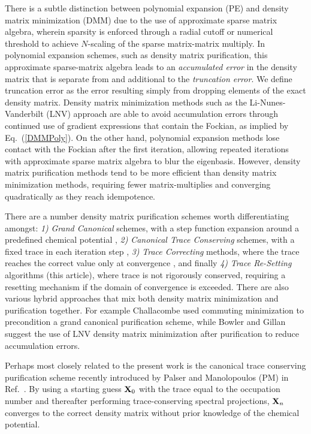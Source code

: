 \commentoutA{\documentclass[prb,aps,twocolumn,showpacs,twocolumngrid,superbib]{revtex4}}
\begin{document}
There is a subtle distinction between polynomial expansion (PE) and density 
matrix minimization (DMM) due to the use of approximate sparse matrix algebra, wherein
sparsity is enforced through a radial cutoff or numerical threshold  to 
achieve $N$-scaling of the sparse matrix-matrix multiply. In polynomial expansion schemes, 
such as density matrix purification, 
this approximate sparse-matrix algebra leads to an {\em accumulated error} in the density matrix 
that is separate from and additional to the {\em truncation error}.  We define truncation error as the 
error resulting simply from dropping elements of the exact density matrix.  Density matrix 
minimization methods such as the Li-Nunes-Vanderbilt \cite{XLi93,DBowler99} (LNV) approach are able to 
avoid accumulation errors through continued use of gradient expressions that contain the Fockian, 
as implied by Eq.~(\ref{DMMPoly}). On the other hand, polynomial expansion methods lose contact 
with the Fockian after the first iteration, allowing repeated iterations with 
approximate sparse matrix algebra to blur the eigenbasis.  However, density matrix purification 
methods tend to be more efficient than density matrix minimization methods, requiring fewer 
matrix-multiplies and converging quadratically as they reach idempotence.

There are a number density matrix purification schemes worth differentiating amongst: 
{\it 1)} {\it Grand Canonical} schemes, with a step function  expansion around a predefined 
         chemical potential \cite{APalser98,RMcWeeny60,AHolas01,ANiklasson02A,ANiklasson02B},
{\it 2)} {\it Canonical Trace Conserving} schemes, with a fixed trace
         in each iteration step \cite{APalser98}, 
{\it 3)} {\it Trace Correcting} methods, where the trace reaches the correct value only at 
         convergence \cite{ANiklasson02A}, and finally 
{\it 4)} {\it Trace Re-Setting} algorithms (this article), where trace is not rigorously conserved,
          requiring a resetting  mechanism if the domain of convergence is exceeded.
There are also various hybrid approaches that mix both density matrix minimization and 
purification together.  For example Challacombe\cite{MChallacombe99} used  commuting 
minimization  to precondition a grand canonical purification scheme,
while Bowler and Gillan \cite{DBowler99} suggest the use of LNV density matrix minimization 
after purification to reduce accumulation errors.

Perhaps most closely related to the present work is the canonical trace 
conserving purification scheme recently introduced by Palser and Manolopoulos 
(PM) in Ref.~. 
By using a starting guess ${\bf X}_0$ with the trace equal to 
the occupation number and thereafter performing trace-conserving
spectral projections, ${\bf X}_n$ converges to the correct density matrix without
prior knowledge of the chemical potential. 
\end{document}
